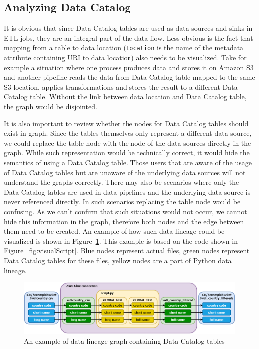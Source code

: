 \subsection{Analyzing Data Catalog}
It is obvious that since Data Catalog tables are used as data sources and sinks in ETL jobs, they are an integral part of the data flow. Less obvious is the fact that mapping from a table to data location (\texttt{Location} is the name of the metadata attribute containing URI to data location) also needs to be visualized. Take for example a situation where one process produces data and stores it on Amazon S3 and another pipeline reads the data from Data Catalog table mapped to the same S3 location, applies transformations and stores the result to a different Data Catalog table. Without the link between data location and Data Catalog table, the graph would be disjointed.
\par
It is also important to review whether the nodes for Data Catalog tables should exist in graph. Since the tables themselves only represent a different data source, we could replace the table node with the node of the data sources directly in the graph. While such representation would be technically correct, it would hide the semantics of using a Data Catalog table. Those users that are aware of the usage of Data Catalog tables but are unaware of the underlying data sources will not understand the graphs correctly. There may also be scenarios where only the Data Catalog tables are used in data pipelines and the underlying data source is never referenced directly. In such scenarios replacing the table node would be confusing. As we can’t confirm that such situations would not occur, we cannot hide this information in the graph, therefore both nodes and the edge between them need to be created. An example of how such data lineage could be visualized is shown in Figure~\ref{fig:catalogLineage}. This example is based on the code shown in Figure~\ref{fig:visualScript}. Blue nodes represent actual files, green nodes represent Data Catalog tables for these files, yellow nodes are a part of Python data lineage.

\begin{figure}[ht]\centering
\includegraphics[width=1.0\textwidth]{img/catalog_lineage.png}
\caption{An example of data lineage graph containing Data Catalog tables}
\label{fig:catalogLineage}
\end{figure}

